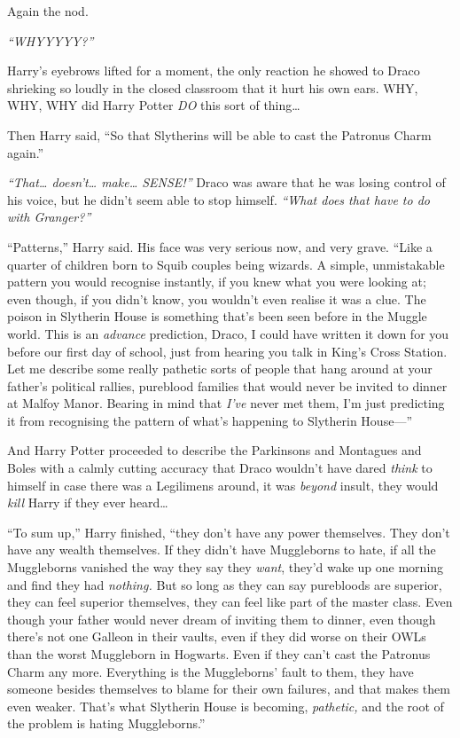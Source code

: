 Again the nod.

\emph{``WHYYYYY?''}

Harry's eyebrows lifted for a moment, the only reaction he showed to
Draco shrieking so loudly in the closed classroom that it hurt his own
ears. WHY, WHY, WHY did Harry Potter \emph{DO} this sort of
thing\ldots{}

Then Harry said, ``So that Slytherins will be able to cast the Patronus
Charm again.''

\emph{``That\ldots{} doesn't\ldots{} make\ldots{} SENSE!''} Draco was
aware that he was losing control of his voice, but he didn't seem able
to stop himself. \emph{``What does that have to do with Granger?''}

``Patterns,'' Harry said. His face was very serious now, and very grave.
``Like a quarter of children born to Squib couples being wizards. A
simple, unmistakable pattern you would recognise instantly, if you knew
what you were looking at; even though, if you didn't know, you wouldn't
even realise it was a clue. The poison in Slytherin House is something
that's been seen before in the Muggle world. This is an \emph{advance}
prediction, Draco, I could have written it down for you before our first
day of school, just from hearing you talk in King's Cross Station. Let
me describe some really pathetic sorts of people that hang around at
your father's political rallies, pureblood families that would never be
invited to dinner at Malfoy Manor. Bearing in mind that \emph{I've}
never met them, I'm just predicting it from recognising the pattern of
what's happening to Slytherin House---''

And Harry Potter proceeded to describe the Parkinsons and Montagues and
Boles with a calmly cutting accuracy that Draco wouldn't have dared
\emph{think} to himself in case there was a Legilimens around, it was
\emph{beyond} insult, they would \emph{kill} Harry if they ever
heard\ldots{}

``To sum up,'' Harry finished, ``they don't have any power themselves.
They don't have any wealth themselves. If they didn't have Muggleborns
to hate, if all the Muggleborns vanished the way they say they
\emph{want}, they'd wake up one morning and find they had
\emph{nothing.} But so long as they can say purebloods are superior,
they can feel superior themselves, they can feel like part of the master
class. Even though your father would never dream of inviting them to
dinner, even though there's not one Galleon in their vaults, even if
they did worse on their OWLs than the worst Muggleborn in Hogwarts. Even
if they can't cast the Patronus Charm any more. Everything is the
Muggleborns' fault to them, they have someone besides themselves to
blame for their own failures, and that makes them even weaker. That's
what Slytherin House is becoming, \emph{pathetic,} and the root of the
problem is hating Muggleborns.''

